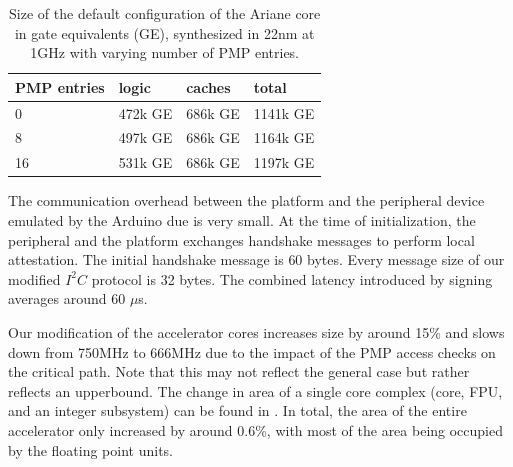 \begin{table}[tbp]
    \centering
    \caption{Size of the default configuration of the Ariane core in gate equivalents (GE), synthesized in 22nm at 1GHz with varying number of PMP entries.}\vspace{-0.5em}
    \begin{tabular}{llll}\toprule
        PMP entries & logic & caches & total \\\midrule
        0 & 472k GE & 686k GE & 1141k GE \\
        8 & 497k GE & 686k GE & 1164k GE \\
        16 & 531k GE & 686k GE & 1197k GE \\ \bottomrule
    \end{tabular}
    
    \label{tab:eval:ariane}
\end{table}

 The communication overhead between the platform and the peripheral device emulated by the Arduino due is very small. At the time of initialization, the peripheral and the platform exchanges handshake messages to perform local attestation. The initial handshake message is $60$ bytes. Every message size of our modified $I^2C$ protocol is 32 bytes. The combined latency introduced by signing averages around 60 $\mu$s.

Our modification of the accelerator cores increases size by around 15\% and slows down from 750MHz to 666MHz due to the impact of the PMP access checks on the critical path. Note that this may not reflect the general case but rather reflects an upperbound. The change in area of a single core complex (core, FPU, and an integer subsystem) can be found in . In total, the area of the entire accelerator only increased by around 0.6\%, with most of the area being occupied by the floating point units.


